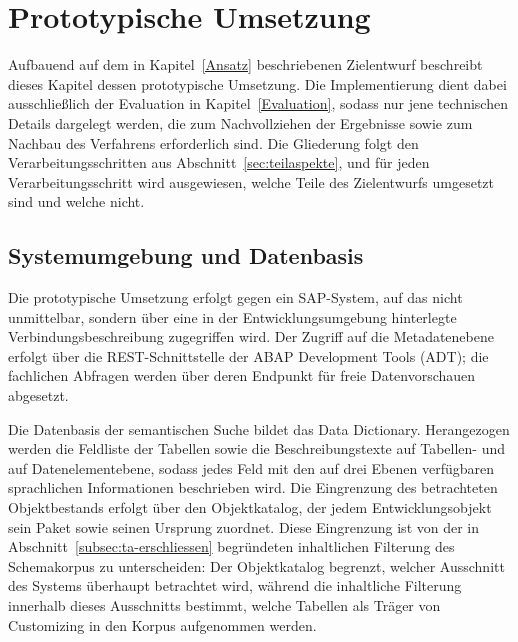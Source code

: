 \chapter{Prototypische Umsetzung}
\label{Implementierung}

Aufbauend auf dem in Kapitel~\ref{Ansatz} beschriebenen Zielentwurf beschreibt dieses Kapitel dessen prototypische Umsetzung. Die Implementierung dient dabei ausschließlich der Evaluation in Kapitel~\ref{Evaluation}, sodass nur jene technischen Details dargelegt werden, die zum Nachvollziehen der Ergebnisse sowie zum Nachbau des Verfahrens erforderlich sind. Die Gliederung folgt den Verarbeitungsschritten aus Abschnitt~\ref{sec:teilaspekte}, und für jeden Verarbeitungsschritt wird ausgewiesen, welche Teile des Zielentwurfs umgesetzt sind und welche nicht. %

\section{Systemumgebung und Datenbasis}
\label{sec:impl-umgebung}

Die prototypische Umsetzung erfolgt gegen ein SAP-System, auf das nicht unmittelbar, sondern über eine in der Entwicklungsumgebung hinterlegte Verbindungsbeschreibung zugegriffen wird. Der Zugriff auf die Metadatenebene erfolgt über die REST-Schnittstelle der ABAP Development Tools (ADT); die fachlichen Abfragen werden über deren Endpunkt für freie Datenvorschauen abgesetzt.

Die Datenbasis der semantischen Suche bildet das Data Dictionary. Herangezogen werden die Feldliste der Tabellen sowie die Beschreibungstexte auf Tabellen- und auf Datenelementebene, sodass jedes Feld mit den auf drei Ebenen verfügbaren sprachlichen Informationen beschrieben wird. Die Eingrenzung des betrachteten Objektbestands erfolgt über den Objektkatalog, der jedem Entwicklungsobjekt sein Paket sowie seinen Ursprung zuordnet. Diese Eingrenzung ist von der in Abschnitt~\ref{subsec:ta-erschliessen} begründeten inhaltlichen Filterung des Schemakorpus zu unterscheiden: Der Objektkatalog begrenzt, welcher Ausschnitt des Systems überhaupt betrachtet wird, während die inhaltliche Filterung innerhalb dieses Ausschnitts bestimmt, welche Tabellen als Träger von Customizing in den Korpus aufgenommen werden.

